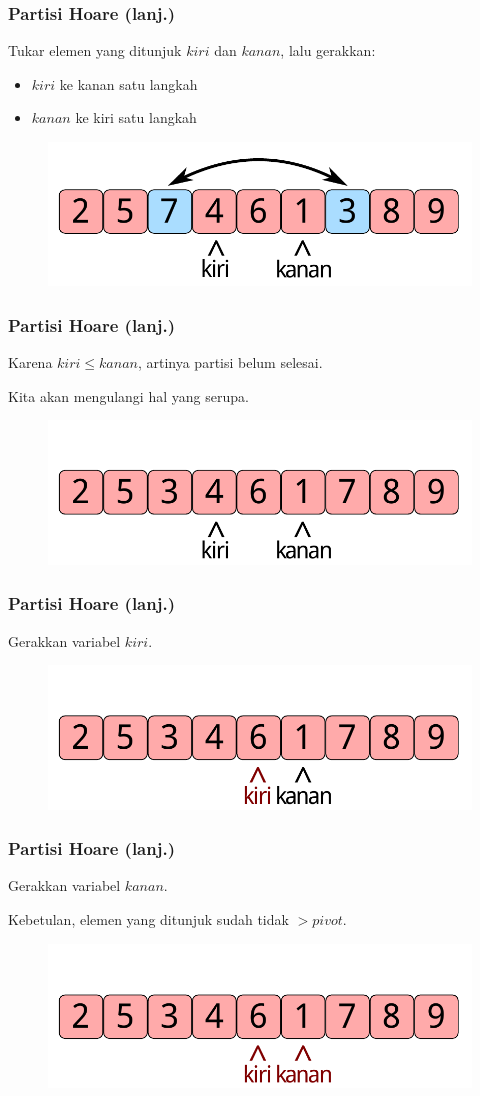 \begin{frame}
\frametitle{Partisi Hoare (lanj.)}
Tukar elemen yang ditunjuk $kiri$ dan $kanan$, lalu gerakkan:
\begin{itemize}
  \item $kiri$ ke kanan satu langkah
  \item $kanan$ ke kiri satu langkah
\end{itemize}
\begin{figure}
  \centering
  \includegraphics[width=7 cm]{asset/partition-4.pdf}
\end{figure}
\end{frame}

\begin{frame}
\frametitle{Partisi Hoare (lanj.)}
Karena $kiri \leq kanan$, artinya partisi belum selesai.

Kita akan mengulangi hal yang serupa.
\begin{figure}
  \centering
  \includegraphics[width=7 cm]{asset/partition-5.pdf}
\end{figure}
\end{frame}

\begin{frame}
\frametitle{Partisi Hoare (lanj.)}
Gerakkan variabel $kiri$.
\begin{figure}
  \centering
  \includegraphics[width=7 cm]{asset/partition-6.pdf}
\end{figure}
\end{frame}

\begin{frame}
\frametitle{Partisi Hoare (lanj.)}
Gerakkan variabel $kanan$.

Kebetulan, elemen yang ditunjuk sudah tidak $> pivot$.
\begin{figure}
  \centering
  \includegraphics[width=7 cm]{asset/partition-7.pdf}
\end{figure}
\end{frame}

